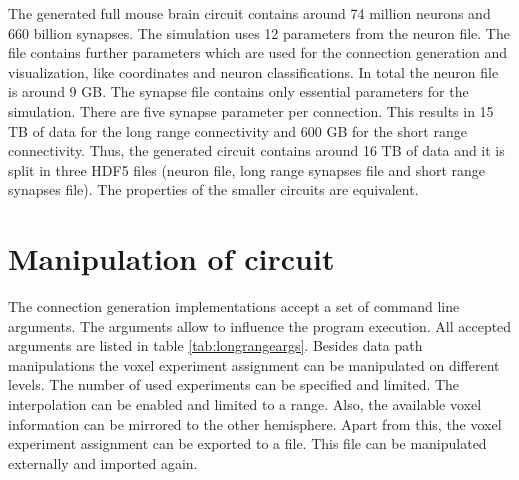 The generated full mouse brain circuit contains around 74 million neurons and 660 billion synapses.
The simulation uses 12 parameters from the neuron file.
The file contains further parameters which are used for the connection generation and visualization,
like coordinates and neuron classifications. In total the neuron file is around 9 GB.
The synapse file contains only essential parameters for the simulation.
There are five synapse parameter per connection. This results in 15 TB of data
for the long range connectivity and 600 GB for the short range connectivity.
Thus, the generated circuit contains around 16 TB of data and it is split in three HDF5
files (neuron file, long range synapses file and short range synapses file).
The properties of the smaller circuits are equivalent.

\section{Manipulation of circuit}

The connection generation implementations accept a set of command line arguments.
The arguments allow to influence the program execution.
All accepted arguments are listed in table \ref{tab:longrangeargs}.
Besides data path manipulations the voxel experiment assignment can be 
manipulated on different levels. The number of used experiments can be specified
and limited. The interpolation can be enabled and limited to a range.
Also, the available voxel information can be mirrored to the other hemisphere.
Apart from this, the voxel experiment assignment can be exported to a file.
This file can be manipulated externally and imported again.

